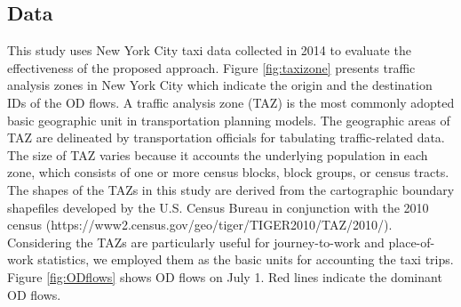 \documentclass[a4paper,UKenglish]{lipics-v2018}
\begin{document}
\subsection{Data}
This study uses New York City taxi data collected in 2014 to evaluate the effectiveness of the proposed approach.
Figure \ref{fig:taxizone} presents traffic analysis zones in New York City which indicate the origin and the destination IDs of the OD flows. 
A traffic analysis zone (TAZ) is the most commonly adopted basic geographic unit in transportation planning models.
The geographic areas of TAZ are delineated by transportation officials for tabulating traffic-related data.
The size of TAZ varies because it accounts the underlying population in each zone, which consists of one or more census blocks, block groups, or census tracts.
The shapes of the TAZs in this study are derived from the cartographic boundary shapefiles developed by the U.S. Census Bureau in conjunction with the 2010 census (https://www2.census.gov/geo/tiger/TIGER2010/TAZ/2010/).
Considering the TAZs are particularly useful for journey-to-work and place-of-work statistics, we employed them as the basic units for accounting the taxi trips. 
Figure \ref{fig:ODflows} shows OD flows on July 1.
Red lines indicate the dominant OD flows.
\end{document}
